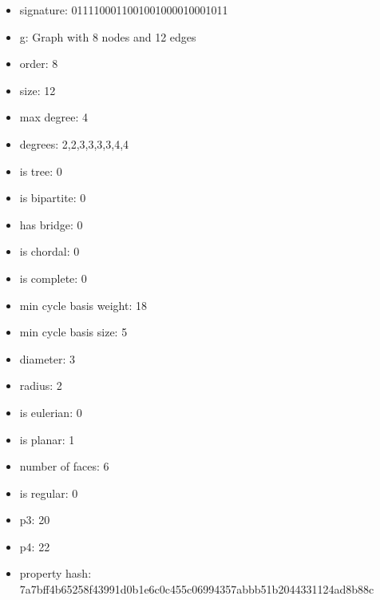 \begin{itemize}
\item signature: 0111100011001001000010001011
\item g: Graph with 8 nodes and 12 edges
\item order: 8
\item size: 12
\item max degree: 4
\item degrees: 2,2,3,3,3,3,4,4
\item is tree: 0
\item is bipartite: 0
\item has bridge: 0
\item is chordal: 0
\item is complete: 0
\item min cycle basis weight: 18
\item min cycle basis size: 5
\item diameter: 3
\item radius: 2
\item is eulerian: 0
\item is planar: 1
\item number of faces: 6
\item is regular: 0
\item p3: 20
\item p4: 22
\item property hash: 7a7bff4b65258f43991d0b1e6c0c455c06994357abbb51b2044331124ad8b88c
\end{itemize}
\newpage
\begin{figure}
\end{figure}

